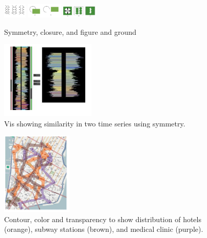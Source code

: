 \begin{mdframed}
\begin{multicols}{2}
\begin{figure}[H]
    \end{figure}
    \begin{figure}[H]
        \centering
        \includegraphics[width=0.1\textwidth]{Gestalten/symmetry.png}
        \includegraphics[width=0.15\textwidth]{Gestalten/closure.png}
        \includegraphics[width=0.15\textwidth]{Gestalten/figure_ground.png}
        \caption{Symmetry, closure, and figure and ground}
    \end{figure}
\end{multicols}\end{mdframed}

\begin{mdframed}
\begin{multicols}{2}
    \begin{figure}[H]
        \centering
        \includegraphics[width=0.4\textwidth]{symmetry_vis.png}
        \caption{Vis showing similarity in two time series using symmetry.}
    \end{figure}
    \begin{figure}[H]
        \centering
        \includegraphics[width=0.3\textwidth]{color_and_region_vis.png}
        \caption{Contour, color and transparency to show distribution of
            hotels (orange), subway stations (brown), and medical clinic
            (purple).}
    \end{figure}
\end{multicols}
\end{mdframed}


